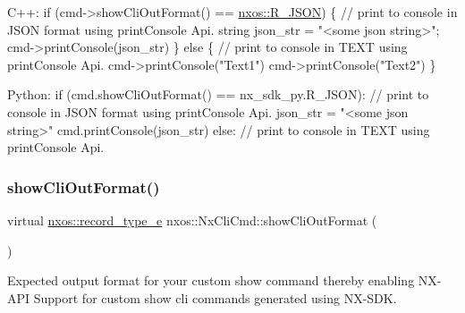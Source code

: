 \begin{DoxyCode}
C++:
     \textcolor{keywordflow}{if} (cmd->showCliOutFormat() == \mbox{\hyperlink{nx__common_8h_a8952d5a318ed66cef9c7a83c7fd3ae91a7c816fd58e178eb1f281c37cd5a51d34}{nxos::R\_JSON}}) \{
         \textcolor{comment}{// print to console in JSON format using printConsole Api.}
         \textcolor{keywordtype}{string} json\_str = \textcolor{stringliteral}{"<some json string>"};
         cmd->printConsole(json\_str)
     \} \textcolor{keywordflow}{else} \{
         \textcolor{comment}{// print to console in TEXT using printConsole Api.}
         cmd->printConsole(\textcolor{stringliteral}{"Text1"})
         cmd->printConsole(\textcolor{stringliteral}{"Text2"})
     \} 

Python:
     \textcolor{keywordflow}{if} (cmd.showCliOutFormat() == nx\_sdk\_py.R\_JSON):
         \textcolor{comment}{// print to console in JSON format using printConsole Api.}
         json\_str = \textcolor{stringliteral}{"<some json string>"}
         cmd.printConsole(json\_str)
     \textcolor{keywordflow}{else}:
         \textcolor{comment}{// print to console in TEXT using printConsole Api.}
\end{DoxyCode}
 \mbox{\label{classnxos_1_1_nx_cli_cmd_a71600fafefdd017050e3a357f03ddd24}} 
\subsubsection{\texorpdfstring{show\+Cli\+Out\+Format()}{showCliOutFormat()}}
{\footnotesize\ttfamily virtual \mbox{\hyperlink{nx__common_8h_a8952d5a318ed66cef9c7a83c7fd3ae91}{nxos\+::record\+\_\+type\+\_\+e}} nxos\+::\+Nx\+Cli\+Cmd\+::show\+Cli\+Out\+Format (\begin{DoxyParamCaption}{ }\end{DoxyParamCaption})\hspace{0.3cm}{\ttfamily [pure virtual]}}

Expected output format for your custom show command thereby enabling N\+X-\/\+A\+PI Support for custom show cli commands generated using N\+X-\/\+S\+DK.

